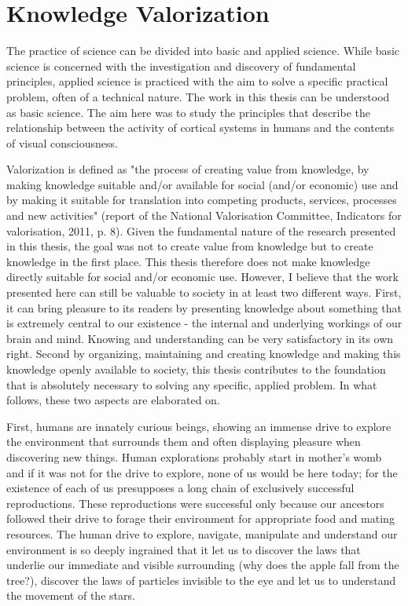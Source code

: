 \chapter{Knowledge Valorization}
\beginvalorization
The practice of science can be divided into basic and applied science. While basic science is concerned with the investigation and discovery of fundamental principles, applied science is practiced with the aim to solve a specific practical problem, often of a technical nature. The work in this thesis can be understood as basic science. The aim here was to study the principles that describe the relationship between the activity of cortical systems in humans and the contents of visual consciousness.

Valorization is defined as "the process of creating value from knowledge, by making knowledge suitable and/or available for social (and/or economic) use and by making it suitable for translation into competing products, services, processes and new activities" (report of the National Valorisation Committee, Indicators for valorisation, 2011, p. 8). Given the fundamental nature of the research presented in this thesis, the goal was not to create value from knowledge but to create knowledge in the first place. This thesis therefore does not make knowledge directly suitable for social and/or economic use. However, I believe that the work presented here can still be valuable to society in at least two different ways. First, it can bring pleasure to its readers by presenting knowledge about something that is extremely central to our existence - the internal and underlying workings of our brain and mind. Knowing and understanding can be very satisfactory in its own right. Second by organizing, maintaining and creating knowledge and making this knowledge openly available to society, this thesis contributes to the foundation that is absolutely necessary to solving any specific, applied problem. In what follows, these two aspects are elaborated on.

First, humans are innately curious beings, showing an immense drive to explore the environment that surrounds them and often displaying pleasure when discovering new things. Human explorations probably start in mother's womb and if it was not for the drive to explore, none of us would be here today; for the existence of each of us presupposes a long chain of exclusively successful reproductions. These reproductions were successful only because our ancestors followed their drive to forage their environment for appropriate food and mating resources. The human drive to explore, navigate, manipulate and understand our environment is so deeply ingrained that it let us to discover the laws that underlie our immediate and visible surrounding (why does the apple fall from the tree?), discover the laws of particles invisible to the eye and let us to understand the movement of the stars.

